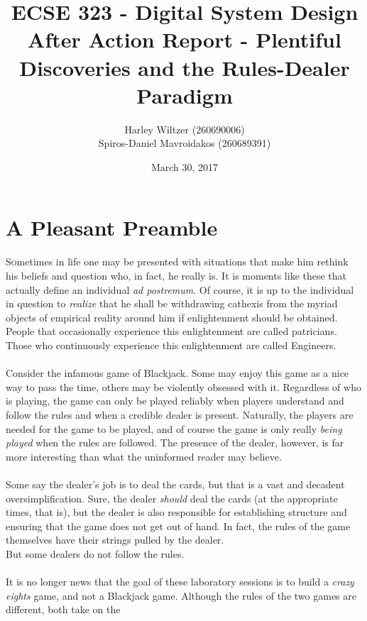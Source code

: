 \documentclass[12pt]{report}
\title{ECSE 323 - Digital System Design\\After Action Report - Plentiful Discoveries and the
Rules-Dealer Paradigm}
\author{Harley Wiltzer (260690006)\\Spiros-Daniel Mavroidakos (260689391)}
\date{March 30, 2017}
\begin{document}
\maketitle
\newpage
\pagestyle{fancy}
\fancyhf{}
\tableofcontents

\part{A Pleasant Preamble}
\label{s:preamble}
\lettrine{S}ometimes in life one may be presented with situations that make him rethink his beliefs and
question who, in fact, he really is. It is moments like these that actually define an individual
\textit{ad postremum}. Of course, it is up to the individual in question to \textit{realize} that he shall be
withdrawing cathexis from the myriad objects of empirical reality around him if enlightenment should
be obtained. People that occasionally experience this enlightenment are called patricians. Those who
continuously experience this enlightenment are called Engineers.\\\\
Consider the infamous game of Blackjack. Some may enjoy this game as a nice way to pass the time,
others may be violently obsessed with it. Regardless of who is playing, the game can only be played
reliably when players understand and follow the rules and when a credible dealer is present.
Naturally, the players are needed for the game to be played, and of course the game is only really
\textit{being played} when the rules are followed. The presence of the dealer, however, is far more
interesting than what the uninformed reader may believe.\\\\
Some say the dealer's job is to deal the cards, but that is a vast and decadent oversimplification.
Sure, the dealer \textit{should} deal the cards (at the appropriate times, that is), but the dealer
is also responsible for establishing structure and ensuring that the game does not get out of hand.
In fact, the rules of the game themselves have their strings pulled by the dealer. \\But some dealers
do not follow the rules.\\\\
It is no longer news that the goal of these laboratory sessions is to build a \textit{crazy eights}
game, and not a Blackjack game. Although the rules of the two games are different, both take on the
\end{document}
